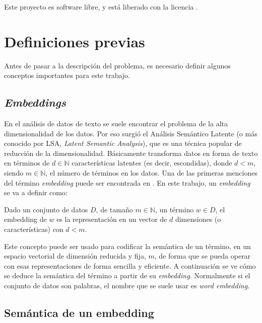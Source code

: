 Este proyecto es software libre, y está liberado con la licencia \cite{gplv3}.

\section*{Definiciones previas}

Antes de pasar a la descripción del problema, es necesario definir algunos conceptos importantes para
este trabajo.

\subsection*{\textit{Embeddings}}

En el análisis de datos de texto se suele encontrar el problema de la alta dimensionalidad de los datos. Por eso surgió el
Análisis Semántico Latente (o más conocido por LSA, \textit{Latent Semantic Analysis}), que es una técnica popular
de reducción de la dimensionalidad. Básicamente transforma datos en forma de texto en términos de $d\in\mathbb{N}$
características latentes (es decir, escondidas), donde $d<m$, siendo $m\in\mathbb{N}$, el número de términos en los
datos. Una de las primeras menciones del término \textit{embedding} puede ser encontrada en \cite{landauer1997learning}.
En este trabajo, un \textit{embedding} se va a definir como:

\begin{definition}[Embedding]
    Dado un conjunto de datos $D$, de tamaño $m\in\mathbb{N}$, un término $w\in D$, el embedding de $w$ es
    la representación en un vector de $d$ dimensiones (o características) con $d<m$.
\end{definition}

Este concepto puede ser usado para codificar la semántica de un término, en un espacio vectorial de dimensión reducida
y fija, $m$, de forma que se pueda operar con esas representaciones de forma sencilla y eficiente. A continuación se ve cómo
se deduce la semántica del término a partir de su \textit{embedding}. Normalmente si el conjunto de datos son palabras, el nombre
que se suele usar es \textit{word embedding}.

\subsection*{Semántica de un embedding}

